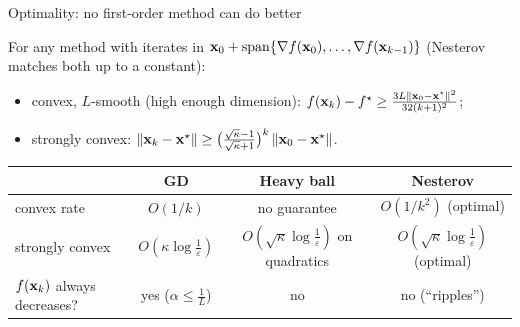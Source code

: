 \begin{frame}{Optimality: no first-order method can do better}
  \begin{thmbox}
    \small For any method with iterates in $\mathbf{x}_0+\operatorname{span}\{\nabla f(\mathbf{x}_0),\dots,\nabla f(\mathbf{x}_{k-1})\}$
    (Nesterov matches both up to a constant):
    \begin{itemize}
      \item convex, $L$-smooth (high enough dimension): $f(\mathbf{x}_k)-f^\star\ge\frac{3L\left\lVert \mathbf{x}_0-\mathbf{x}^\star \right\rVert^2}{32(k+1)^2}$;
      \item strongly convex: $\left\lVert \mathbf{x}_k-\mathbf{x}^\star \right\rVert\ge\bigl(\frac{\sqrt\kappa-1}{\sqrt\kappa+1}\bigr)^k\left\lVert \mathbf{x}_0-\mathbf{x}^\star \right\rVert$.
    \end{itemize}
  \end{thmbox}
  \centering\footnotesize
  \begin{tabular}{@{}l c c c@{}}
    \toprule
    & GD & Heavy ball & Nesterov \\
    \midrule
    convex rate & $O(1/k)$ & no guarantee & $O(1/k^2)$ \textcolor{mGreen}{(optimal)} \\
    strongly convex & $O(\kappa\log\frac1\varepsilon)$ & $O(\sqrt\kappa\log\frac1\varepsilon)$ on quadratics & $O(\sqrt\kappa\log\frac1\varepsilon)$ \textcolor{mGreen}{(optimal)} \\
    $f(\mathbf{x}_k)$ always decreases? & yes ($\alpha\le\frac1L$) & no & no (``ripples'') \\
    \bottomrule
  \end{tabular}
\end{frame}


